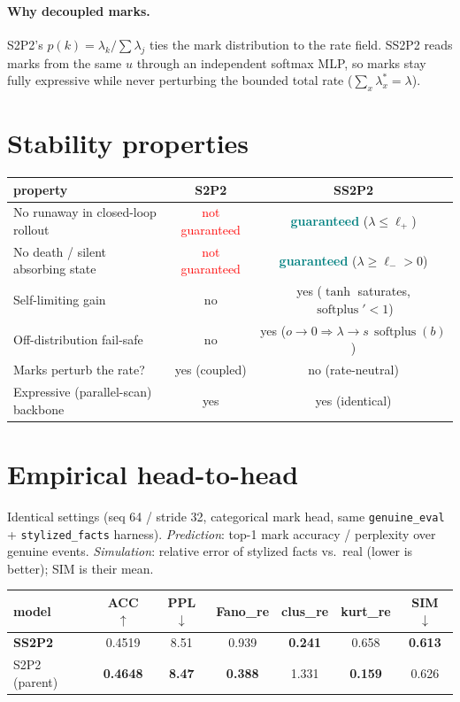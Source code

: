 \documentclass[11pt]{article}
\newcommand{\softplus}{\operatorname{softplus}}
\begin{document}
\paragraph{Why decoupled marks.} S2P2's $p(k)=\lambda_k/\sum\lambda_j$ ties the mark
distribution to the rate field. SS2P2 reads marks from the same $u$ through an independent
softmax MLP, so marks stay fully expressive while never perturbing the bounded total rate
($\sum_x\lambda^*_x=\lambda$).

\section{Stability properties}
\begin{center}\small\renewcommand{\arraystretch}{1.2}
\begin{tabular}{lcc}
\toprule
property & S2P2 & SS2P2\\
\midrule
No runaway in closed-loop rollout & \textcolor{red}{not guaranteed} & \textcolor{teal}{\textbf{guaranteed}} ($\lambda\le\ell_+$)\\
No death / silent absorbing state & \textcolor{red}{not guaranteed} & \textcolor{teal}{\textbf{guaranteed}} ($\lambda\ge\ell_->0$)\\
Self-limiting gain & no & yes ($\tanh$ saturates, $\softplus'<1$)\\
Off-distribution fail-safe & no & yes ($o\!\to\!0\Rightarrow\lambda\!\to\!s\,\softplus(b)$)\\
Marks perturb the rate? & yes (coupled) & no (rate-neutral)\\
Expressive (parallel-scan) backbone & yes & yes (identical)\\
\bottomrule
\end{tabular}
\end{center}

\section{Empirical head-to-head}
Identical settings (seq 64 / stride 32, categorical mark head, same \texttt{genuine\_eval} +
\texttt{stylized\_facts} harness). \emph{Prediction}: top-1 mark accuracy / perplexity over
genuine events. \emph{Simulation}: relative error of stylized facts vs.\ real (lower is
better); SIM is their mean.

\begin{center}\small\renewcommand{\arraystretch}{1.25}
\begin{tabular}{lcccccc}
\toprule
model & ACC $\uparrow$ & PPL $\downarrow$ & Fano\_re & clus\_re & kurt\_re & \textbf{SIM} $\downarrow$\\
\midrule
\textbf{SS2P2} & 0.4519 & 8.51 & 0.939 & \textbf{0.241} & 0.658 & \textbf{0.613}\\
S2P2 (parent)  & \textbf{0.4648} & \textbf{8.47} & \textbf{0.388} & 1.331 & \textbf{0.159} & 0.626\\
\bottomrule
\end{tabular}
\end{center}
\end{document}
